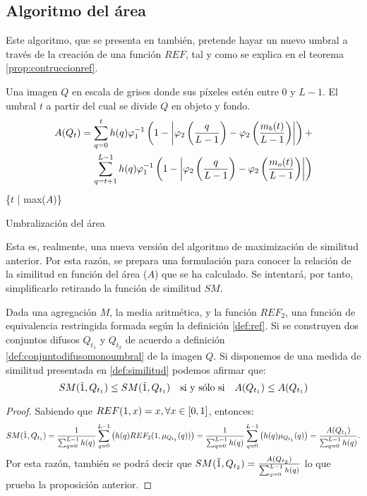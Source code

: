 \subsection{Algoritmo del área}

Este algoritmo, que se presenta en \cite{art:barrenechea} también, pretende hayar un nuevo umbral a través de la creación de una función $REF$, tal y como se explica en el teorema \ref{prop:contruccionref}.

\begin{algorithm}
\begin{algorithmic}[1]
\REQUIRE Una imagen $Q$ en escala de grises donde sus píxeles estén entre $0$ y $L-1$.
\ENSURE El umbral $t$ a partir del cual se divide $Q$ en objeto y fondo.
\STATE \begin{equation*}\begin{split}
A(Q_t)= \sum_{q=0}^{t} h(q)\varphi_1^{-1}\left(1-\left\vert\varphi_2\left(\frac{q}{L-1}\right)-\varphi_2\left(\frac{m_b(t)}{L-1}\right)\right\vert\right) + \\ \sum_{q=t+1}^{L-1} h(q)\varphi_1^{-1}\left(1-\left\vert\varphi_2\left(\frac{q}{L-1}\right)-\varphi_2\left(\frac{m_o(t)}{L-1}\right)\right\vert\right)
\end{split}\end{equation*}
\ENDFOR
\RETURN \{$t$ | max($A$)\}
\end{algorithmic}
\caption{Umbralización del área}\label{alg:algoritmo2}
\end{algorithm}

Esta es, realmente, una nueva versión del algoritmo de maximización de similitud anterior. Por esta razón, se prepara una formulación para conocer la relación de la similitud en función del área ($A$) que se ha calculado. Se intentará, por tanto, simplificarlo retirando la función de similitud $SM$.
\begin{proposition}
Dada una agregación $M$, la media aritmética, y la función $REF_2$, una función de equivalencia restringida formada según la definición \ref{def:ref}. Si se construyen dos conjuntos difusos $Q_{t_1}$ y $Q_{t_2}$ de acuerdo a definición \ref{def:conjuntodifusomonoumbral} de la imagen $Q$. Si disponemos de una medida de similitud presentada en \ref{def:similitud} podemos afirmar que:
$$SM(\tilda1, Q_{t_1})\leq SM(\tilda1, Q_{t_1})\quad \text{si y sólo si}\quad A(Q_{t_1})\leq A(Q_{t_1})$$
\end{proposition}
\begin{proof}
Sabiendo que $REF(1,x)=x, \forall x\in[0,1]$, entonces:
$$SM(\tilda1, Q_{t_1}) 
= \frac{1}{\sum_{q=0}^{L-1}h(q)}\sum_{q=0}^{L-1}\left( h(q)REF_2(1, \mu_{Q_{t_1}}(q))\right) 
= \frac{1}{\sum_{q=0}^{L-1}h(q)}\sum_{q=0}^{L-1}\left( h(q)\mu_{Q_{t_1}}(q)\right)
= \frac{A(Q_{t_1})}{\sum_{q=0}^{L-1}h(q)}.$$
Por esta razón, también se podrá decir que $SM(\tilda1, Q_{t_2}) = \frac{A(Q_{t_2})}{\sum_{q=0}^{L-1}h(q)}$ lo que prueba la proposición anterior.
\end{proof}

